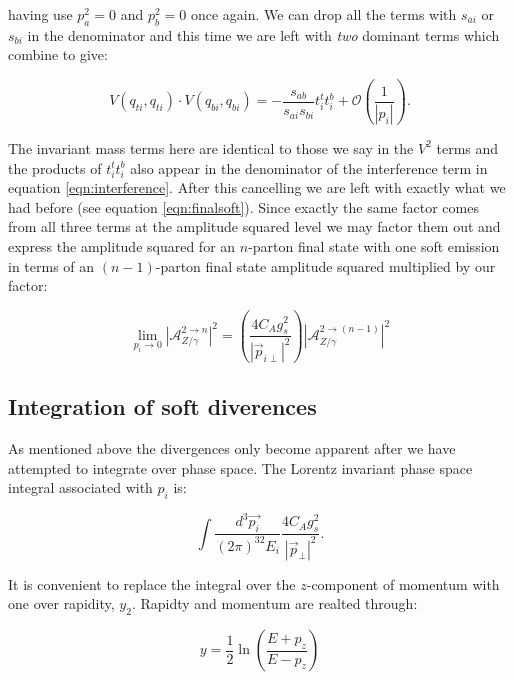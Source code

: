		having use $p_a^2=0$ and $p_b^2=0$ once again.  We can drop all the terms with $s_{ai}$ or
		$s_{bi}$ in the denominator and this time we are left with \emph{two} dominant terms which
		combine to give:

		\begin{equation}
			V(q_{ti}, q_{ti})\cdot V(q_{bi}, q_{bi}) = -\frac{s_{ab}}{s_{ai}s_{bi}}t_i^tt_i^b +
				\mathcal{O}\left(\frac{1}{|p_i|}\right).
		\end{equation}

		The invariant mass terms here are identical to those we say in the $V^2$ terms and the products of
		$t_i^tt_i^b$ also appear in the denominator of the interference term in equation \ref{eqn:interference}.
		After this cancelling we are left with exactly what we had before (see equation \ref{eqn:finalsoft}).
		Since exactly the same factor comes from all three terms at the amplitude squared level we may factor
		them out and express the amplitude squared for an $n$-parton final state with one soft emission in
		terms of an $(n-1)$-parton final state amplitude squared multiplied by our factor:

		\begin{equation}
			\lim_{p_i\rightarrow0} |\mathcal{A}_{Z/\gamma}^{2\rightarrow n}|^2 = \left(\frac{4C_Ag_s^2}{|\vec{p}_{i\perp}|^2}\right)
				|\mathcal{A}_{Z/\gamma}^{2\rightarrow (n-1)}|^2
		\end{equation}

	\subsection{Integration of soft diverences}
	\label{sub:subsection_name}

		As mentioned above the divergences only become apparent after we have attempted to integrate over
		phase space.  The Lorentz invariant phase space integral associated with $p_i$ is:

		\begin{equation}
			\int\frac{d^3\vec{p_i}}{(2\pi)^32E_i}\frac{4C_Ag_s^2}{|\vec{p}_\perp|^2}.
		\end{equation}

		It is convenient to replace the integral over the $z$-component of momentum with one over rapidity,
		$y_2$.  Rapidty and momentum are realted through:

		\begin{equation}
			y = \frac12\ln\left(\frac{E + p_z}{E - p_z}\right)
		\end{equation}

